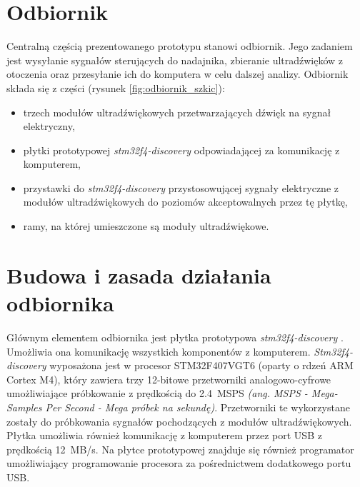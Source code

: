 \section{Odbiornik}

Centralną częścią prezentowanego prototypu stanowi odbiornik.
Jego zadaniem jest wysyłanie sygnałów sterujących do nadajnika, zbieranie ultradźwięków z otoczenia oraz przesyłanie 
ich do komputera w celu dalszej analizy.
Odbiornik składa się z części (rysunek \ref{fig:odbiornik_szkic}):

\begin{itemize}
 \item trzech modułów ultradźwiękowych przetwarzających dźwięk na sygnał elektryczny,
 \item płytki prototypowej \textit{stm32f4-discovery} \cite{bib:stm32f4Discovery} odpowiadającej za komunikację z komputerem,
 \item przystawki do \textit{stm32f4-discovery} przystosowującej sygnały elektryczne z modułów ultradźwiękowych
  do poziomów akceptowalnych przez tę płytkę,
 \item ramy, na której umieszczone są moduły ultradźwiękowe.
\end{itemize}




\section{Budowa i zasada działania odbiornika}

Głównym elementem odbiornika jest płytka prototypowa \textit{stm32f4-discovery} \cite{bib:stm32f4Discovery}.
 Umożliwia ona komunikację wszystkich komponentów z komputerem.
\textit{Stm32f4-discovery} wyposażona jest w procesor STM32F407VGT6 \cite{bib:stm32f407} (oparty o rdzeń ARM Cortex M4), 
który zawiera trzy 12-bitowe przetworniki
analogowo-cyfrowe umożliwiające próbkowanie z prędkością do \SI{2,4}{MSPS} 
\textit{(ang. MSPS - Mega-Samples Per Second - Mega próbek na sekundę)}. Przetworniki te wykorzystane zostały do próbkowania
sygnałów pochodzących z modułów ultradźwiękowych. Płytka umożliwia również komunikację z komputerem przez 
port USB z prędkością \SI{12}{MB/s}. Na płytce prototypowej znajduje się również programator
umożliwiający programowanie procesora za pośrednictwem dodatkowego portu USB.

